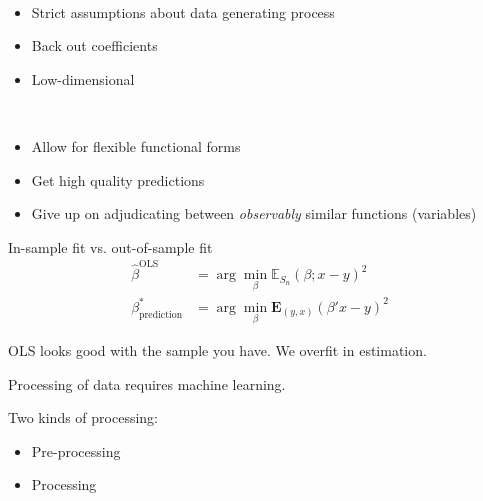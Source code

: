 \documentclass[a4paper,10pt,landscape]{article}
\begin{document}
\begin{multicols*}{3}
\begin{description}
	\item[Estimation] ~
	\begin{itemize}
		\item Strict assumptions about data generating process
		\item Back out coefficients
		\item Low-dimensional
	\end{itemize} 
	\item[Prediction] ~
	\begin{itemize}
		\item Allow for flexible functional forms
		\item Get high quality predictions
		\item Give up on adjudicating between {\it observably} similar functions (variables)
	\end{itemize}
	\item[Undestanding OLS] In-sample fit vs. out-of-sample fit
	\begin{align*}
		\hat{\beta}^\text{OLS}&=\arg\min_{\beta}\mathbb{E}_{S_n}\left(\beta;x-y\right)^2\\
		\beta^*_\text{prediction} &=\arg\min_{\beta}\mathbf{E}_{(y,x)}\left(\beta'x-y\right)^2
	\end{align*}
	\item OLS looks good with the sample you have. We overfit in estimation.
	\item Processing of data requires machine learning.
	\item Two kinds of processing:
	\begin{itemize}
		\item Pre-processing
		\item Processing
	\end{itemize}
\end{description}



\end{multicols*}
\end{document}
